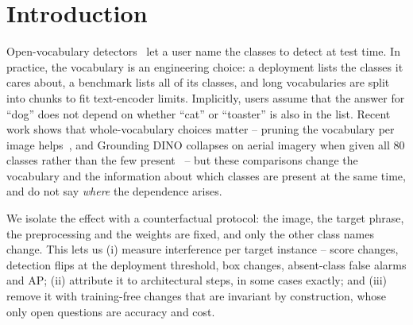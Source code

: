 \documentclass[10pt,twocolumn,letterpaper]{article}
\begin{document}
\begin{abstract}
image) the bank with Soft-NMS is 2.0 AP below the fixed chunks, largely because its score scale differs between classes; a fixed,
label-free per-class logit shift (a cross-class calibration in the sense of~\cite{devil}), estimated once on 300 unlabelled images, raises it on 1{,}000 held-out images from
0.377 to 0.405 AP in a single pass, level with standard 14-pass inference (0.398; $+$0.70, CI $-$0.23 to $+$2.05) at 6.7$\times$ lower cost. The same shift
also raises the chunks, to 0.412, so it corrects a cross-class score scale under the per-image detection cap rather than a
weakness of the bank, and does not help YOLO-World; against equally corrected chunks the bank is 0.69 AP lower (95\% CI $-$1.50 to $+$0.59), so
non-inferiority at 1 AP is not shown. The bank does not transfer to the
smaller checkpoint. Two random five-name requests
leave aggregate counts nearly unchanged yet flip 9.0\% of decisions on present image--class pairs, so benchmark averages hide the
effect. For YOLO-World and OWLv2 the
corrections cost 0.94--1.14$\times$ original inference and match or exceed the better of single-class and full-list
inference on held-out data (on LVIS: YOLO-World $+$7.8 mAP50 over the better baseline; OWLv2 equals single-class inference and is $+$20.7 over the full list).
\end{abstract}

\section{Introduction}
Open-vocabulary detectors~\cite{gdino,yoloworld,owlv2} let a user name the classes to detect at test time. In practice,
the vocabulary is an engineering choice: a deployment lists the classes it cares about, a benchmark lists all of its
classes, and long vocabularies are split into chunks to fit text-encoder limits. Implicitly, users assume that the
answer for ``dog'' does not depend on whether ``cat'' or ``toaster'' is also in the list. Recent work shows that
whole-vocabulary choices matter -- pruning the vocabulary per image helps~\cite{vocada}, and Grounding DINO collapses on
aerial imagery when given all 80 classes rather than the few present~\cite{aerial} -- but these comparisons change the
vocabulary and the information about which classes are present at the same time, and do not say \emph{where} the
dependence arises.

We isolate the effect with a counterfactual protocol: the image, the target phrase, the preprocessing and the weights
are fixed, and only the other class names change. This lets us (i) measure interference per target instance --
score changes, detection flips at the deployment threshold, box changes, absent-class false alarms and AP; (ii)
attribute it to architectural steps, in some cases exactly; and (iii) remove it with training-free changes that are
invariant by construction, whose only open questions are accuracy and cost.
\end{document}
